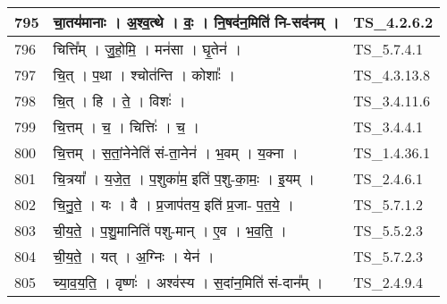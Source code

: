 \documentclass[17pt]{extarticle}
\begin{document}
\begin{longtable}{||p{0.4in}||p{4.9in}||p{0.9in}||}
    795 & चा॒तय॑मानाः   ।   अ॒श्व॒त्थे   ।   वः॒   ।   नि॒षद॑न॒मिति॑ नि{-}सद॑नम्   ।    & TS\_4.2.6.2       \\
    
    \hline
        
    796 & चित्ति᳚म्   ।   जु॒हो॒मि॒   ।   मन॑सा   ।   घृ॒तेन॑   ।    & TS\_5.7.4.1       \\
    
    \hline
        
    797 & चि॒त्   ।   प॒था   ।   श्चोत॑न्ति   ।   कोशाः᳚   ।    & TS\_4.3.13.8       \\
    
    \hline
        
    798 & चि॒त्   ।   हि   ।   ते॒   ।   विशः॑   ।    & TS\_3.4.11.6       \\
    
    \hline
        
    799 & चि॒त्तम्   ।   च॒   ।   चित्तिः॑   ।   च॒   ।    & TS\_3.4.4.1       \\
    
    \hline
        
    800 & चि॒त्तम्   ।   स॒तां॒नेनेति॑ सं{-}ता॒नेन॑   ।   भ॒वम्   ।   य॒क्ना   ।    & TS\_1.4.36.1       \\
    
    \hline
        
    801 & चि॒त्रया᳚   ।   य॒जे॒त॒   ।   प॒शुका॑म॒ इति॑ प॒शु{-}का॒मः॒   ।   इ॒यम्   ।    & TS\_2.4.6.1       \\
    
    \hline
        
    802 & चि॒नु॒ते॒   ।   यः   ।   वै   ।   प्र॒जाप॑तय॒ इति॑ प्र॒जा{-} प॒त॒ये॒   ।    & TS\_5.7.1.2       \\
    
    \hline
        
    803 & ची॒य॒ते॒   ।   प॒शु॒मानिति॑ पशु{-}मान्   ।   ए॒व   ।   भ॒व॒ति॒   ।    & TS\_5.5.2.3       \\
    
    \hline
        
    804 & ची॒य॒ते॒   ।   यत्   ।   अ॒ग्निः   ।   येन॑   ।    & TS\_5.7.2.3       \\
    
    \hline
        
    805 & च्या॒व॒य॒ति॒   ।   वृष्णः॑   ।   अश्व॑स्य   ।   स॒दांन॒मिति॑ सं{-}दान᳚म्   ।    & TS\_2.4.9.4       \\
    

\end{longtable}
\end{document}
